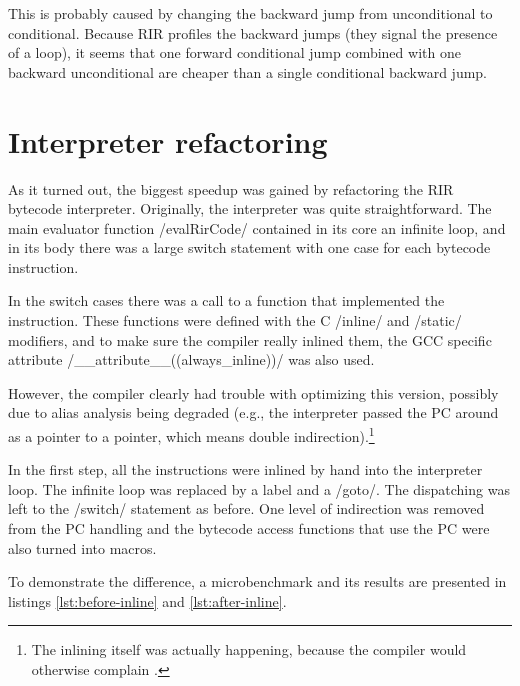 This is probably caused by changing the backward jump from unconditional to conditional. Because RIR profiles the backward jumps (they signal the presence of a loop), it seems that one forward conditional jump combined with one backward unconditional are cheaper than a single conditional backward jump.


\section{Interpreter refactoring}

As it turned out, the biggest speedup was gained by refactoring the RIR bytecode interpreter. Originally, the interpreter was quite straightforward. The main evaluator function \cinline/evalRirCode/ contained in its core an infinite loop, and in its body there was a large switch statement with one case for each bytecode instruction.

In the switch cases there was a call to a function that implemented the instruction. These functions were defined with the C \cinline/inline/ and \cinline/static/ modifiers, and to make sure the compiler really inlined them, the GCC specific attribute \cinline/__attribute__((always_inline))/ was also used.

However, the compiler clearly had trouble with optimizing this version, possibly due to alias analysis being degraded (e.g., the interpreter passed the PC around as a pointer to a pointer, which means double indirection).\footnote{The inlining itself was actually happening, because the compiler would otherwise complain \autocite{gcc-inline}.}

In the first step, all the instructions were inlined by hand into the interpreter loop. The infinite loop was replaced by a label and a \cinline/goto/. The dispatching was left to the \cinline/switch/ statement as before. One level of indirection was removed from the PC handling and the bytecode access functions that use the PC were also turned into macros. 


To demonstrate the difference, a microbenchmark and its results are presented in listings \ref{lst:before-inline} and \ref{lst:after-inline}.

